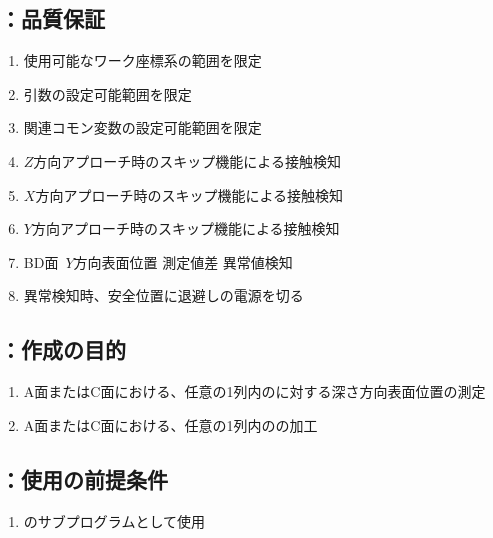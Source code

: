 \subsection{\DLone：品質保証}
\begin{enumerate}[label*=\sarrow]
\item 使用可能なワーク座標系の範囲を限定
\item {}引数の設定可能範囲を限定
\item 関連コモン変数の設定可能範囲を限定
\item $Z$方向アプローチ時のスキップ機能による接触検知
\item $X$方向アプローチ時のスキップ機能による接触検知
\item $Y$方向アプローチ時のスキップ機能による接触検知
\item BD面\Dimple~$Y$方向表面位置 測定値差 異常値検知
\item 異常検知時、安全位置に退避し\TouchSensorProbe の電源を切る
\end{enumerate}



\clearpage


\subsection{\DLtwoAC：作成の目的}
\begin{enumerate}[label*=\sarrow]
\item A面またはC面における、任意の1列内の\Dimple に対する深さ方向表面位置の測定
\item A面またはC面における、任意の1列内の\Dimple の加工
\end{enumerate}


\subsection{\DLtwoAC：使用の前提条件}
\begin{enumerate}[label*=\sarrow]
\item \DLone のサブプログラムとして使用
\end{enumerate}


